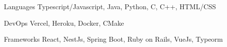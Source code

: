 

\begin{cvskills}

  \cvskill
  {Languages}
  {Typescript/Javascript, Java, Python, C, C++, HTML/CSS}

  \cvskill
  {DevOps}
  {Vercel, Heroku, Docker, CMake}

  \cvskill
  {Frameworks}
  {React, NestJs, Spring Boot, Ruby on Rails, VueJs, Typeorm}

\end{cvskills}
